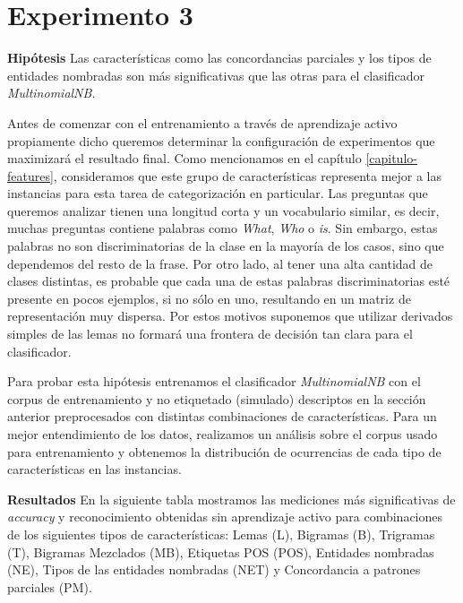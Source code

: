 \section{Experimento 3}
\vspace{3 mm}
\textbf{Hipótesis} Las características como las concordancias parciales y los tipos de entidades nombradas son más significativas que las otras para el clasificador \textit{MultinomialNB}.
\vspace{3 mm}

Antes de comenzar con el entrenamiento a través de aprendizaje activo propiamente dicho queremos determinar la configuración de experimentos que maximizará el resultado final. Como mencionamos en el capítulo \ref{capitulo-features}, consideramos que este grupo de características representa mejor a las instancias para esta tarea de categorización en particular. Las preguntas que queremos analizar tienen una longitud corta y un vocabulario similar, es decir, muchas preguntas contiene palabras como \textit{What}, \textit{Who} o \textit{is}. Sin embargo, estas palabras no son discriminatorias de la clase en la mayoría de los casos, sino que dependemos del resto de la frase. Por otro lado, al tener una alta cantidad de clases distintas, es probable que cada una de estas palabras discriminatorias esté presente en pocos ejemplos, si no sólo en uno, resultando en un matriz de representación muy dispersa. Por estos motivos suponemos que utilizar derivados simples de las lemas no formará una frontera de decisión tan clara para el clasificador.

Para probar esta hipótesis entrenamos el clasificador \textit{MultinomialNB} con el corpus de entrenamiento y no etiquetado (simulado) descriptos en la sección anterior preprocesados con distintas combinaciones de características. Para un mejor entendimiento de los datos, realizamos un análisis sobre el corpus usado para entrenamiento y obtenemos la distribución de ocurrencias de cada tipo de características en las instancias.

\vspace{3 mm}

\textbf{Resultados} En la siguiente tabla mostramos las mediciones más significativas de \textit{accuracy} y reconocimiento obtenidas sin aprendizaje activo para combinaciones de los siguientes tipos de características: Lemas (L), Bigramas (B), Trigramas (T), Bigramas Mezclados (MB), Etiquetas POS (POS), Entidades nombradas (NE), Tipos de las entidades nombradas (NET) y Concordancia a patrones parciales (PM).

